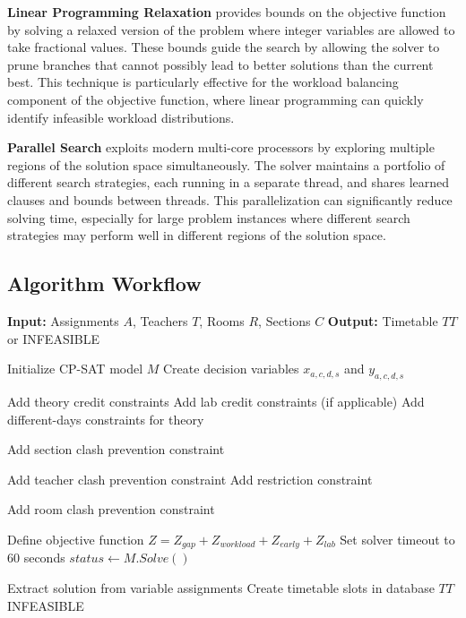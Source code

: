 \documentclass[12pt,a4paper]{article}
\begin{document}
\textbf{Linear Programming Relaxation} provides bounds on the objective function by solving a relaxed version of the problem where integer variables are allowed to take fractional values. These bounds guide the search by allowing the solver to prune branches that cannot possibly lead to better solutions than the current best. This technique is particularly effective for the workload balancing component of the objective function, where linear programming can quickly identify infeasible workload distributions.

\textbf{Parallel Search} exploits modern multi-core processors by exploring multiple regions of the solution space simultaneously. The solver maintains a portfolio of different search strategies, each running in a separate thread, and shares learned clauses and bounds between threads. This parallelization can significantly reduce solving time, especially for large problem instances where different search strategies may perform well in different regions of the solution space.

\subsection{Algorithm Workflow}

\begin{algorithm}
\caption{Timetable Generation Algorithm}
\begin{algorithmic}[1]
\State \textbf{Input:} Assignments $A$, Teachers $T$, Rooms $R$, Sections $C$
\State \textbf{Output:} Timetable $TT$ or INFEASIBLE

\State Initialize CP-SAT model $M$
\State Create decision variables $x_{a,c,d,s}$ and $y_{a,c,d,s}$

    \State Add theory credit constraints
    \State Add lab credit constraints (if applicable)
    \State Add different-days constraints for theory
\EndFor

        \State Add section clash prevention constraint
    \EndFor
\EndFor

        \State Add teacher clash prevention constraint
            \State Add restriction constraint
        \EndIf
    \EndFor
\EndFor

        \State Add room clash prevention constraint
    \EndFor
\EndFor

\State Define objective function $Z = Z_{gap} + Z_{workload} + Z_{early} + Z_{lab}$
\State Set solver timeout to 60 seconds
\State $status \gets M.Solve()$

    \State Extract solution from variable assignments
    \State Create timetable slots in database
    \State \Return $TT$
\Else
    \State \Return INFEASIBLE
\EndIf
\end{algorithmic}
\end{algorithm}
\end{document}
